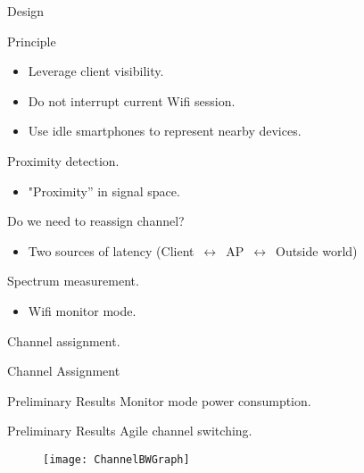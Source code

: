 \begin{frame}{\PS{} Design}
  \begin{block}{Principle}
    \begin{itemize}
      \item Leverage client visibility.
      \item Do not interrupt current Wifi session.
      \item Use idle smartphones to represent nearby devices.
    \end{itemize}
  \end{block}
   Proximity detection.
   \begin{itemize}
     \item "Proximity'' in signal space.
   \end{itemize}
   Do we need to reassign channel?
   \begin{itemize}
     \item Two sources of latency
       (Client~$\longleftrightarrow$~AP~$\longleftrightarrow$~Outside world)
   \end{itemize}
   Spectrum measurement.
   \begin{itemize}
     \item Wifi monitor mode.
   \end{itemize}
   Channel assignment.
\end{frame}

\begin{frame}{Channel Assignment}
  \begin{figure}
    \begin{subfigure}{0.5\textwidth}
    \end{subfigure}
    \begin{subfigure}{0.5\textwidth}
    \end{subfigure}
    \begin{subfigure}{0.5\textwidth}
    \end{subfigure}
    \begin{subfigure}{0.5\textwidth}
    \end{subfigure}
  \end{figure}
\end{frame}

\begin{frame}{Preliminary Results}
  Monitor mode power consumption.
\end{frame}

\begin{frame}{Preliminary Results}
  Agile channel switching.
  \begin{figure}
    \centering
    \texttt{[image: ChannelBWGraph]}
  \end{figure}
\end{frame}
